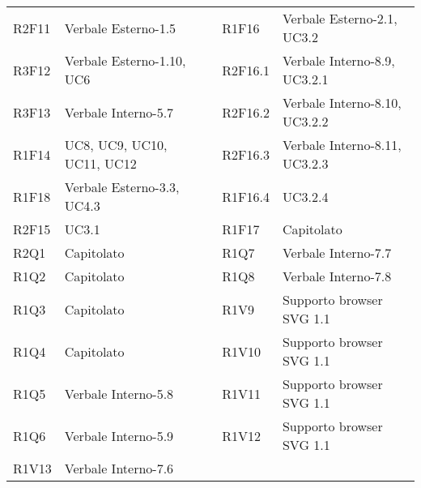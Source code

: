 \begin{center}
\begin{longtable}{C{2cm} | C{5cm} C{0.2cm} C{2cm} | C{5cm}}
R2F11 & Verbale Esterno-1.5 &  & R1F16 & Verbale Esterno-2.1, UC3.2 \\
R3F12 & Verbale Esterno-1.10, UC6 &  & R2F16.1 & Verbale Interno-8.9, UC3.2.1 \\
R3F13 & Verbale Interno-5.7 &  & R2F16.2 & Verbale Interno-8.10, UC3.2.2 \\
R1F14 & UC8, UC9, UC10, UC11, UC12 &  & R2F16.3 & Verbale Interno-8.11, UC3.2.3 \\
R1F18 & Verbale Esterno-3.3, UC4.3 &  & R1F16.4 & UC3.2.4 \\
R2F15 & UC3.1 &  & R1F17 & Capitolato \\

R2Q1 & Capitolato &  & R1Q7 & Verbale Interno-7.7\\
R1Q2 & Capitolato &  & R1Q8 & Verbale Interno-7.8\\
R1Q3 & Capitolato &  & R1V9 & Supporto browser SVG 1.1\\
R1Q4 & Capitolato &  & R1V10 & Supporto browser SVG 1.1\\
R1Q5 & Verbale Interno-5.8 &  & R1V11 & Supporto browser SVG 1.1\\
R1Q6 & Verbale Interno-5.9 &  & R1V12 & Supporto browser SVG 1.1\\
R1V13 & Verbale Interno-7.6\\
\end{longtable}
\end{center}


























